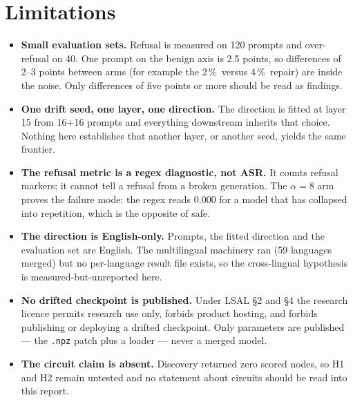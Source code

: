 \documentclass[11pt,a4paper]{article}
\newcommand{\pct}{\,\%}
\begin{document}
\section{Limitations}

\begin{itemize}[leftmargin=1.2em,itemsep=2pt,topsep=2pt]
\item \textbf{Small evaluation sets.} Refusal is measured on 120 prompts and over-refusal on 40. One
prompt on the benign axis is 2.5 points, so differences of 2--3 points between arms (for example the
2\pct\ versus 4\pct\ repair) are inside the noise. Only differences of five points or more should be read
as findings.
\item \textbf{One drift seed, one layer, one direction.} The direction is fitted at layer 15 from 16+16
prompts and everything downstream inherits that choice. Nothing here establishes that another layer, or
another seed, yields the same frontier.
\item \textbf{The refusal metric is a regex diagnostic, not ASR.} It counts refusal markers; it cannot tell
a refusal from a broken generation. The $\alpha=8$ arm proves the failure mode: the regex reads 0.000 for
a model that has collapsed into repetition, which is the opposite of safe.
\item \textbf{The direction is English-only.} Prompts, the fitted direction and the evaluation set are
English. The multilingual machinery ran (59 languages merged) but no per-language result file exists, so
the cross-lingual hypothesis is measured-but-unreported here.
\item \textbf{No drifted checkpoint is published.} Under LSAL \S2 and \S4 the research licence permits
research use only, forbids product hosting, and forbids publishing or deploying a drifted checkpoint.
Only parameters are published --- the \texttt{.npz} patch plus a loader --- never a merged model.
\item \textbf{The circuit claim is absent.} Discovery returned zero scored nodes, so H1 and H2 remain
untested and no statement about circuits should be read into this report.
\end{itemize}
\end{document}
